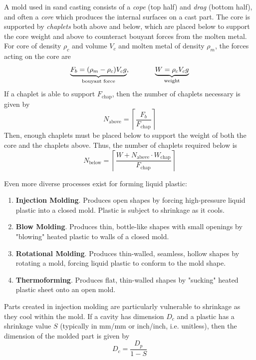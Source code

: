 A mold used in sand casting consists of a \textit{cope} (top half) and \textit{drag} (bottom half), and often a \textit{core} which produces the internal surfaces on a cast part. The core is supported by \textit{chaplets} both above and below, which are placed below to support the core weight and above to counteract bouyant forces from the molten metal. For core of density $\rho_c$ and volume $V_c$ and molten metal of density $\rho_m$, the forces acting on the core are \[\underbrace{F_b = (\rho_m - \rho_c)V_cg}_\text{bouyant force},\hspace{0.5in}\underbrace{W=\rho_cV_cg}_\text{weight}\] If a chaplet is able to support $F_\text{chap}$, then the number of chaplets necessary is given by \[N_\text{above} = \left\lceil\frac{F_b}{F_\text{chap}}\right\rceil\] Then, enough chaplets must be placed below to support the weight of both the core and the chaplets above. Thus, the number of chaplets required below is \[N_\text{below} = \left\lceil\frac{W +N_\text{above}\cdot W_\text{chap}}{F_\text{chap}}\right\rceil\]

\newpage

Even more diverse processes exist for forming liquid plastic:
\begin{enumerate}
    \item[] \textbf{Injection Molding}. Produces open shapes by forcing high-pressure liquid plastic into a closed mold. Plastic is subject to shrinkage as it cools.
    \item[] \textbf{Blow Molding}. Produces thin, bottle-like shapes with small openings by "blowing" heated plastic to walls of a closed mold.
    \item[] \textbf{Rotational Molding}. Produces thin-walled, seamless, hollow shapes by rotating a mold, forcing liquid plastic to conform to the mold shape.
    \item[] \textbf{Thermoforming}. Produces flat, thin-walled shapes by "sucking" heated plastic sheet onto an open mold.
\end{enumerate}

Parts created in injection molding are particularly vulnerable to shrinkage as they cool within the mold. If a cavity has dimension $D_c$ and a plastic has a shrinkage value $S$ (typically in mm/mm or inch/inch, i.e. unitless), then the dimension of the molded part is given by \[D_c = \frac{D_p}{1-S}\]